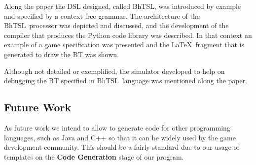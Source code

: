 \documentclass[a4paper,UKenglish,cleveref, autoref, thm-restate]{oasics-v2019}
\def\bht{BhTSL}
\begin{document}
Along the paper the DSL designed, called \bht, was introduced by example and specified by a context 
free grammar. 
The architecture of the \bht\ processor was depicted and discussed, and the development of the compiler that produces the
Python code library  was described.
In that context an example of a game  specification was presented and the \LaTeX\ fragment that is
 generated to draw the BT was shown.
 
Although not detailed or exemplified, the simulator developed to help on debugging the BT specified in
\bht\ language was mentioned along the paper. %

\subsection{Future Work}
As future work we intend to allow to generate code for other programming languages, such as Java and C++ so that it can be widely used by the game development community.
This should be a fairly standard due to our usage of templates on the \textbf{Code Generation} stage of our program.



\end{document}
